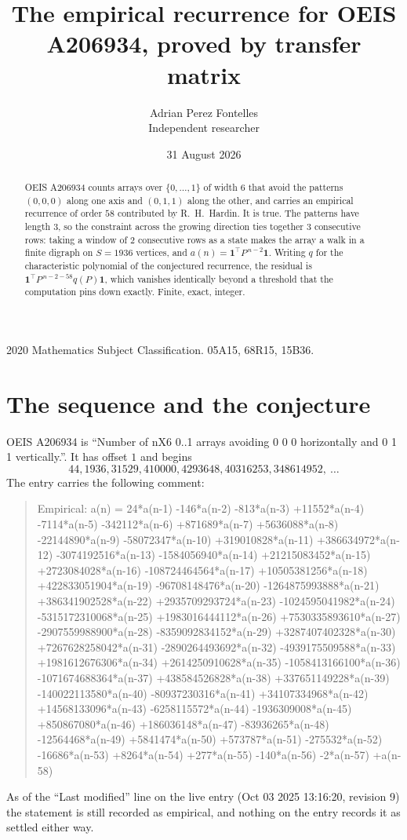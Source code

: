 \documentclass[11pt,a4paper]{article}
\title{The empirical recurrence for OEIS A206934, proved by transfer matrix}
\author{Adrian Perez Fontelles\\ \small Independent researcher}
\date{31 August 2026}
\theoremstyle{plain}
\theoremstyle{definition}
\begin{document}
\maketitle

\begin{abstract}
OEIS A206934 counts arrays over $\{0,\dots,1\}$ of width $6$ that avoid the patterns
$(0,0,0)$ along one axis and $(0,1,1)$ along the other, and carries an empirical recurrence of
order $58$ contributed by R.~H.~Hardin. It is true. The patterns have length $3$, so
the constraint across the growing direction ties together $3$ consecutive rows: taking a
window of $2$ consecutive rows as a state makes the array a walk in a finite digraph
on $S=1936$ vertices, and $a(n)=\mathbf{1}^{\!\top}P^{\,n-2}\mathbf{1}$. Writing $q$
for the characteristic polynomial of the conjectured recurrence, the residual is
$\mathbf{1}^{\!\top}P^{\,n-2-58}q(P)\mathbf{1}$, which vanishes identically
beyond a threshold that the computation pins down exactly. Finite, exact, integer.
\end{abstract}

\noindent\small 2020 Mathematics Subject Classification. 05A15, 68R15, 15B36.\normalsize

\section{The sequence and the conjecture}

OEIS A206934 is ``Number of nX6 0..1 arrays avoiding 0 0 0 horizontally and 0 1 1 vertically.''. It has offset
$1$ and begins
\[
44, 1936, 31529, 410000, 4293648, 40316253, 348614952,\ \dots
\]
The entry carries the following comment:
\begin{quote}\small
Empirical: a(n) = 24*a(n-1) -146*a(n-2) -813*a(n-3) +11552*a(n-4) -7114*a(n-5) -342112*a(n-6) +871689*a(n-7) +5636088*a(n-8) -22144890*a(n-9) -58072347*a(n-10) +319010828*a(n-11) +386634972*a(n-12) -3074192516*a(n-13) -1584056940*a(n-14) +21215083452*a(n-15) +2723084028*a(n-16) -108724464564*a(n-17) +10505381256*a(n-18) +422833051904*a(n-19) -96708148476*a(n-20) -1264875993888*a(n-21) +386341902528*a(n-22) +2935709293724*a(n-23) -1024595041982*a(n-24) -5315172310068*a(n-25) +1983016444112*a(n-26) +7530335893610*a(n-27) -2907559988900*a(n-28) -8359092834152*a(n-29) +3287407402328*a(n-30) +7267628258042*a(n-31) -2890264493692*a(n-32) -4939175509588*a(n-33) +1981612676306*a(n-34) +2614250910628*a(n-35) -1058413166100*a(n-36) -1071674688364*a(n-37) +438584526828*a(n-38) +337651149228*a(n-39) -140022113580*a(n-40) -80937230316*a(n-41) +34107334968*a(n-42) +14568133096*a(n-43) -6258115572*a(n-44) -1936309008*a(n-45) +850867080*a(n-46) +186036148*a(n-47) -83936265*a(n-48) -12564468*a(n-49) +5841474*a(n-50) +573787*a(n-51) -275532*a(n-52) -16686*a(n-53) +8264*a(n-54) +277*a(n-55) -140*a(n-56) -2*a(n-57) +a(n-58)
\end{quote}
As of the ``Last modified'' line on the live entry (Oct 03 2025 13:16:20, revision
9) the statement is still recorded as empirical, and nothing on the entry
records it as settled either way.
\end{document}
